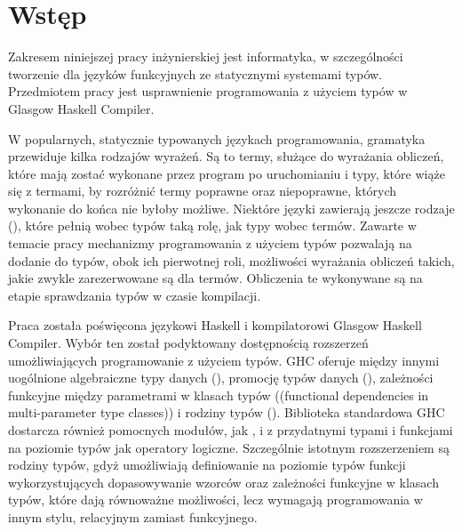 \chapter{Wstęp}\label{chap:wstep}

Zakresem niniejszej pracy inżynierskiej jest informatyka, w szczególności
tworzenie dla języków funkcyjnych ze statycznymi systemami typów.
Przedmiotem pracy jest usprawnienie
programowania z użyciem typów w Glasgow Haskell Compiler.

W popularnych, statycznie typowanych językach programowania, gramatyka przewiduje
kilka rodzajów wyrażeń. Są to termy, służące do wyrażania obliczeń, które mają zostać
wykonane przez program po uruchomianiu i typy, które wiąże się z termami, by
rozróżnić termy poprawne oraz niepoprawne, których wykonanie do końca nie byłoby możliwe.
Niektóre języki zawierają jeszcze rodzaje (), które pełnią wobec
typów taką rolę, jak typy wobec termów. Zawarte w temacie pracy mechanizmy programowania
z użyciem typów pozwalają na dodanie do typów, obok ich pierwotnej roli, możliwości
wyrażania obliczeń takich, jakie zwykle zarezerwowane są dla termów.
Obliczenia te wykonywane są na etapie sprawdzania typów w czasie kompilacji.


Praca została poświęcona językowi Haskell i kompilatorowi Glasgow Haskell
Compiler. Wybór ten został podyktowany dostępnością rozszerzeń umożliwiających
programowanie z użyciem typów. GHC oferuje między innymi uogólnione algebraiczne
typy danych (), promocję typów danych (),
zależności funkcyjne między parametrami w klasach typów
(\foreign(functional dependencies in multi-parameter type classes))
i rodziny typów ().
Biblioteka standardowa GHC dostarcza również pomocnych modułów, jak ,
 i  z przydatnymi typami i funkcjami na poziomie
typów jak operatory logiczne.
Szczególnie istotnym rozszerzeniem są rodziny typów, gdyż umożliwiają
definiowanie na poziomie typów funkcji wykorzystujących
dopasowywanie wzorców oraz zależności funkcyjne w klasach typów,
które dają równoważne możliwości, lecz wymagają programowania w innym stylu,
relacyjnym zamiast funkcyjnego.

